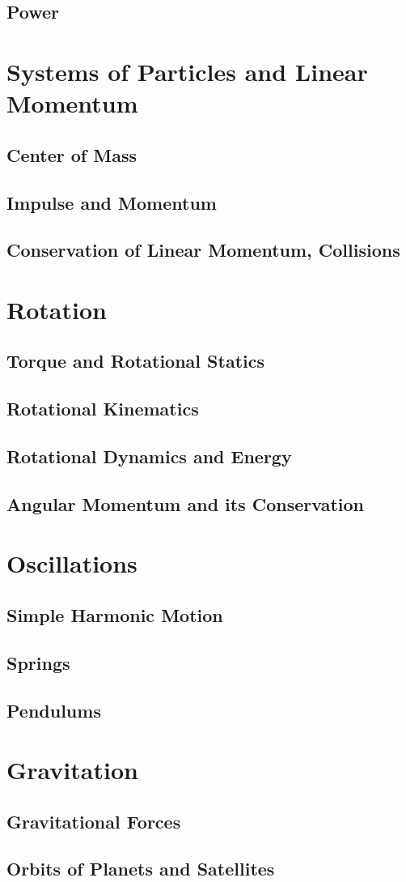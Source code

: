 \documentclass[letterpaper]{report}
\begin{document}
\section{Power}

\chapter{Systems of Particles and Linear Momentum}
\section{Center of Mass}
\section{Impulse and Momentum}
\section{Conservation of Linear Momentum, Collisions}

\chapter{Rotation}
\section{Torque and Rotational Statics}
\section{Rotational Kinematics}
\section{Rotational Dynamics and Energy}
\section{Angular Momentum and its Conservation}

\chapter{Oscillations}
\section{Simple Harmonic Motion}
\section{Springs}
\section{Pendulums}

\chapter{Gravitation}
\section{Gravitational Forces}
\section{Orbits of Planets and Satellites}
\end{document}
